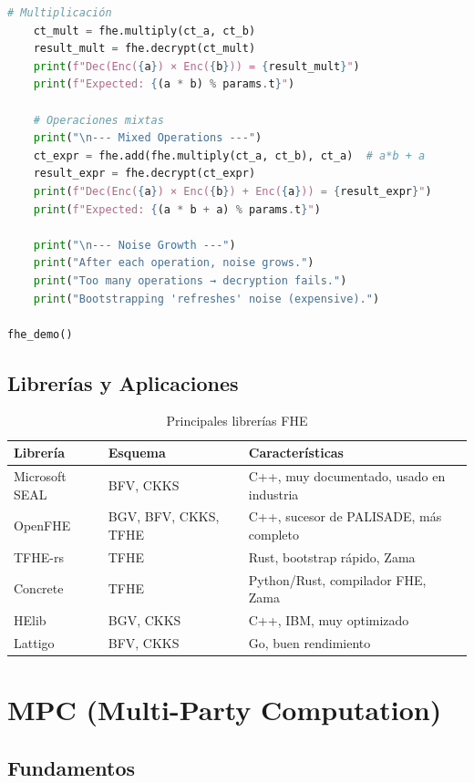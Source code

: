 \documentclass[11pt,a4paper,twoside]{book}
\theoremstyle{definition}
\theoremstyle{remark}
\begin{document}
\begin{lstlisting}[language=Python, caption={Implementación conceptual de FHE (BFV simplificado)}]
    # Multiplicación
    ct_mult = fhe.multiply(ct_a, ct_b)
    result_mult = fhe.decrypt(ct_mult)
    print(f"Dec(Enc({a}) × Enc({b})) = {result_mult}")
    print(f"Expected: {(a * b) % params.t}")
    
    # Operaciones mixtas
    print("\n--- Mixed Operations ---")
    ct_expr = fhe.add(fhe.multiply(ct_a, ct_b), ct_a)  # a*b + a
    result_expr = fhe.decrypt(ct_expr)
    print(f"Dec(Enc({a}) × Enc({b}) + Enc({a})) = {result_expr}")
    print(f"Expected: {(a * b + a) % params.t}")
    
    print("\n--- Noise Growth ---")
    print("After each operation, noise grows.")
    print("Too many operations → decryption fails.")
    print("Bootstrapping 'refreshes' noise (expensive).")

fhe_demo()
\end{lstlisting}

\subsection{Librerías y Aplicaciones}

\begin{table}[htbp]
\centering
\small
\begin{tabular}{llp{5cm}}
\toprule
\textbf{Librería} & \textbf{Esquema} & \textbf{Características} \\
\midrule
Microsoft SEAL & BFV, CKKS & C++, muy documentado, usado en industria \\
OpenFHE & BGV, BFV, CKKS, TFHE & C++, sucesor de PALISADE, más completo \\
TFHE-rs & TFHE & Rust, bootstrap rápido, Zama \\
Concrete & TFHE & Python/Rust, compilador FHE, Zama \\
HElib & BGV, CKKS & C++, IBM, muy optimizado \\
Lattigo & BFV, CKKS & Go, buen rendimiento \\
\bottomrule
\end{tabular}
\caption{Principales librerías FHE}
\end{table}

\section{MPC (Multi-Party Computation)}
\label{sec:mpc}

\subsection{Fundamentos}
\end{document}
